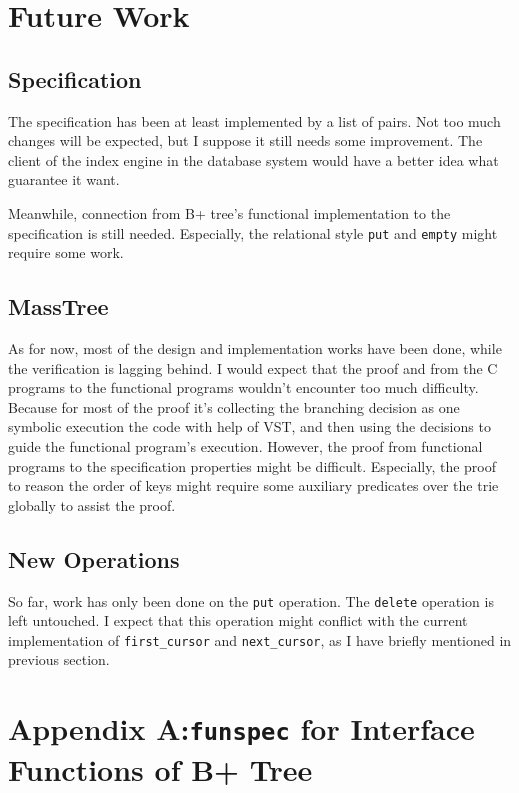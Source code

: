 \documentclass[runningheads]{llncs}
\begin{document}
\section{Future Work}

\subsection{Specification}

The specification has been at least implemented by a list of pairs. Not too much
changes will be expected, but I suppose it still needs some improvement. The
client of the index engine in the database system would have a better idea what
guarantee it want.

Meanwhile, connection from B+ tree's functional implementation to the
specification is still needed. Especially, the relational style \texttt{put} and
\texttt{empty} might require some work.

\subsection{MassTree}

As for now, most of the design and implementation works have been done, while
the verification is lagging behind. I would expect that the proof and from the C
programs to the functional programs wouldn't encounter too much difficulty.
Because for most of the proof it's collecting the branching decision as one
symbolic execution the code with help of VST, and then using the decisions to
guide the functional program's execution. However, the proof from functional
programs to the specification properties might be difficult. Especially, the
proof to reason the order of keys might require some auxiliary predicates over
the trie globally to assist the proof.

\subsection{New Operations}

So far, work has only been done on the \texttt{put} operation. The
\texttt{delete} operation is left untouched. I expect that this operation might
conflict with the current implementation of \texttt{first\_cursor} and
\texttt{next\_cursor}, as I have briefly mentioned in previous section.




\section*{Appendix A:\@\texttt{funspec} for Interface Functions of B+ Tree}
\end{document}

